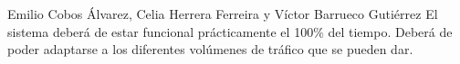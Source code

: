 {Emilio Cobos Álvarez, Celia Herrera Ferreira y Víctor Barrueco Gutiérrez}
{}
{}
{}
{El sistema deberá de estar funcional prácticamente el 100\% del tiempo. Deberá de poder adaptarse a los diferentes volúmenes de tráfico que se pueden dar.}

